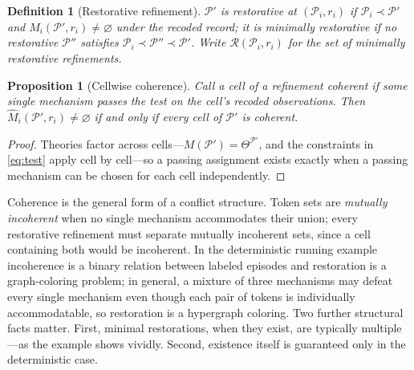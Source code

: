 \documentclass[11pt]{article}
\newtheorem{definition}[assumption]{Definition}
\newtheorem{proposition}[assumption]{Proposition}
\theoremstyle{definition}
\newcommand{\emptysetset}{\varnothing}
\begin{document}
\begin{definition}[Restorative refinement]
\label{def:restorative}
$\mathcal P'$ is \emph{restorative} at $(\mathcal P_i,r_i)$ if
$\mathcal P_i\prec\mathcal P'$ and
$\widehat M_i(\mathcal P',r_i)\neq\emptysetset$ under the recoded record; it
is \emph{minimally restorative} if no restorative $\mathcal P''$ satisfies
$\mathcal P_i\prec\mathcal P''\prec\mathcal P'$.  Write
$\mathcal R(\mathcal P_i,r_i)$ for the set of minimally restorative
refinements.
\end{definition}

\begin{proposition}[Cellwise coherence]
\label{prop:coherence}
Call a cell of a refinement \emph{coherent} if some single mechanism passes
the test on the cell's recoded observations.  Then
$\widehat M_i(\mathcal P',r_i)\neq\emptysetset$ if and only if every cell of
$\mathcal P'$ is coherent.
\end{proposition}

\begin{proof}
Theories factor across cells---$M(\mathcal P')=\Theta^{\mathcal P'}$, and the
constraints in \cref{eq:test} apply cell by cell---so a passing assignment
exists exactly when a passing mechanism can be chosen for each cell
independently.
\end{proof}

Coherence is the general form of a conflict structure.  Token sets are
\emph{mutually incoherent} when no single mechanism accommodates their
union; every restorative refinement must separate mutually incoherent sets,
since a cell containing both would be incoherent.  In the deterministic
running example incoherence is a binary relation between labeled episodes and
restoration is a graph-coloring problem; in general, a mixture of three
mechanisms may defeat every single mechanism even though each pair of tokens
is individually accommodatable, so restoration is a hypergraph coloring.
Two further structural facts matter.  First, minimal restorations, when they
exist, are typically multiple---as the example shows vividly.  Second,
existence itself is guaranteed only in the deterministic case.
\end{document}
